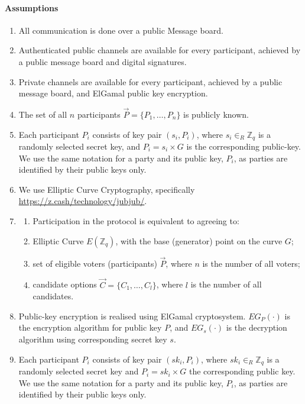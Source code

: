 \documentclass{article}
\begin{document}
\paragraph*{Assumptions}
\begin{enumerate}
    \item All communication is done over a public Message board.
    \item Authenticated public channels are available for every participant, achieved by a public message board and digital signatures.
    \item Private channels are available for every participant, achieved by a public message board, and ElGamal public key encryption.
    \item The set of all $n$ participants $\vec{P} = \{P_1,\dots,P_n\}$ is publicly known. 
    \item Each participant $P_i$ consists of key pair $(s_i, P_i)$, where $s_{i} \in_{R} \mathbb{Z}_q$ is a randomly selected secret key, and $P_{i} = s_i \times G$ is the corresponding public-key. We use the same notation for a party and its public key, $P_i$, as parties are identified by their public keys only.
    \item We use Elliptic Curve Cryptography, specifically \href{babyJubJub curve}{https://z.cash/technology/jubjub/}.
    \item \begin{enumerate}
        \item Participation in the protocol is equivalent to agreeing to:
        \item Elliptic Curve $E(\mathbb{Z}_q)$, with the base (generator) point on the curve $G$;
        \item set of eligible voters (participants) $\vec{P}$, where $n$ is the number of all voters;
        \item candidate options $\vec{C}=\{C_1, \dots, C_l\}$, where $l$ is the number of all candidates.
    \end{enumerate}
    \item Public-key encryption is realised using ElGamal cryptosystem. $EG_{P}(\cdot)$ is the encryption algorithm for public key $P$, and $EG_{s}(\cdot)$ is the decryption algorithm using corresponding secret key $s$.
    \item Each participant $P_i$ consists of key pair $(sk_i, P_i)$, where $sk_{i} \in_{R} \mathbb{Z}_q$ is a randomly selected secret key and $P_{i} = sk_i \times G$ the corresponding public key. We use the same notation for a party and its public key, $P_i$, as parties are identified by their public keys only.
\end{enumerate}
\end{document}
